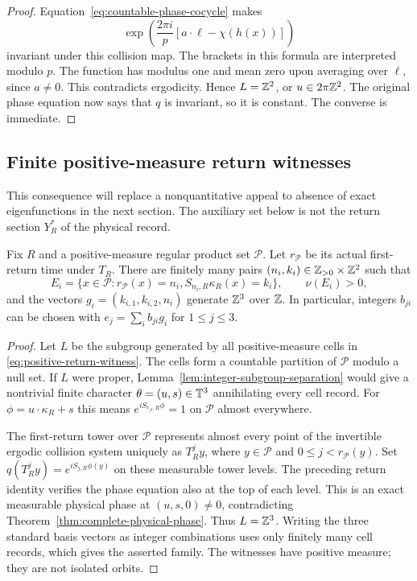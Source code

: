 \begin{proof}
Equation~\eqref{eq:countable-phase-cocycle} makes
\[
 \exp\!\left(\frac{2\pi i}{p}
             [a\cdot\ell-\chi(h(x))]\right)
\]
invariant under this collision map. The brackets in this formula are
interpreted modulo $p$. The function has modulus one and mean zero
upon averaging over $\ell$, since $a\ne0$. This contradicts ergodicity.
Hence $L=\mathbb Z^2$, or $u\in2\pi\mathbb Z^2$. The original phase equation now
says that $q$ is invariant, so it is constant. The converse is immediate.
\end{proof}

\subsection{Finite positive-measure return witnesses}
This consequence will replace a nonquantitative appeal to absence of
exact eigenfunctions in the next section. The auxiliary set below is
not the return section $Y_R^*$ of the physical record.

\begin{lemma}
\label{lem:finite-return-witnesses}
Fix $R$ and a positive-measure regular product set $\mathcal P$.
Let $r_{\mathcal P}$ be its actual first-return time under $T_R$.
There are finitely many pairs $(n_i,k_i)\in\mathbb Z_{>0}\times\mathbb Z^2$ such that
\begin{equation}\label{eq:positive-return-witness}
 E_i=\{x\in\mathcal P:r_{\mathcal P}(x)=n_i,
                  S_{n_i,R}\kappa_R(x)=k_i\},\qquad \nu(E_i)>0,
\end{equation}
and the vectors $g_i=(k_{i,1},k_{i,2},n_i)$ generate $\mathbb Z^3$ over $\mathbb Z$.
In particular, integers $b_{ji}$ can be chosen with
$e_j=\sum_i b_{ji}g_i$ for $1\le j\le3$.
\end{lemma}
\begin{proof}
Let $L$ be the subgroup generated by all positive-measure cells in
\eqref{eq:positive-return-witness}. The cells form a countable partition
of $\mathcal P$ modulo a null set. If $L$ were proper,
Lemma~\ref{lem:integer-subgroup-separation} would give a nontrivial
finite character $\theta=(u,s)\in\mathbb T^3$ annihilating every cell record.
For $\phi=u\cdot\kappa_R+s$ this means
$e^{iS_{r_{\mathcal P},R}\phi}=1$ on $\mathcal P$ almost everywhere.

The first-return tower over $\mathcal P$ represents almost every point
of the invertible ergodic collision system uniquely as $T_R^j y$,
where $y\in\mathcal P$ and $0\le j<r_{\mathcal P}(y)$.
Set $q(T_R^j y)=e^{iS_{j,R}\phi(y)}$ on these measurable tower levels.
The preceding return identity verifies the phase equation also at
the top of each level. This is an exact measurable physical phase at
$(u,s,0)\ne0$, contradicting
Theorem~\ref{thm:complete-physical-phase}. Thus $L=\mathbb Z^3$.
Writing the three standard basis vectors as integer combinations uses
only finitely many cell records, which gives the asserted family.
The witnesses have positive measure; they are not isolated orbits.
\end{proof}
